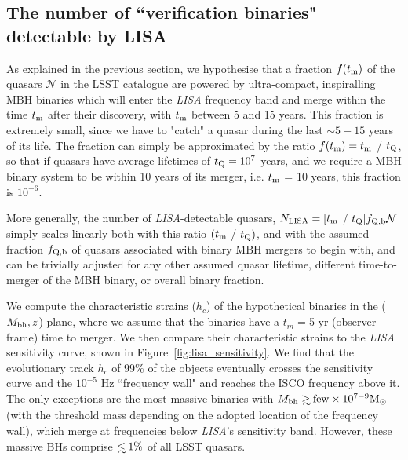 \documentclass[fleqn,usenatbib]{mnras}
\newcommand\lsim{\mathrel{\rlap{\lower4pt\hbox{\hskip1pt$\sim$}}
        \raise1pt\hbox{$<$}}}
\newcommand\gsim{\mathrel{\rlap{\lower4pt\hbox{\hskip1pt$\sim$}}
        \raise1pt\hbox{$>$}}}
\begin{document}
\subsection{The number of ``verification binaries" detectable by LISA} 
\label{sec:LISA-quasar-counts}
%
As explained in the previous section, we hypothesise that a fraction $f(t_{\rm m})$ of the quasars $\mathcal{N}$ in the LSST catalogue are powered by ultra-compact, inspiralling MBH binaries which will enter the {\it LISA} frequency band and merge within the time $t_{\rm m}$ after their discovery, with $t_{\rm m}$ between 5 and 15 years.
This fraction is extremely small, since we have to "catch" a quasar during the last $\sim 5-15$ years of its life. The fraction can simply be approximated by the ratio $f(t_{\rm m})=t_{\rm m}$ / $t_{\rm Q}$, so that if quasars have average lifetimes of $t_{\rm Q} = 10^7$ years, and we require a MBH binary system to be within 10 years of its merger, i.e. $t_{\rm m}$ = 10 years, this fraction is $10^{-6}$.

More generally, the number of {\it LISA}-detectable quasars, $N_{\rm LISA}=[t_{\rm m}$ / $t_{\rm Q}] f_{\rm Q,b} \mathcal{N}$ simply scales linearly both 
with this ratio $(t_{\rm m}$ / $t_{\rm Q})$, and with the assumed fraction $f_{\rm Q,b}$ of quasars associated with binary MBH mergers to begin with, and can be trivially adjusted for any other assumed quasar lifetime, different time-to-merger of the MBH binary, or overall binary fraction.

We compute the characteristic strains ($h_c$) of the hypothetical binaries in the ($M_{\rm bh},z$) plane, where we assume that the binaries have a $t_m=$5 yr (observer frame) time to merger. 
We then compare their characteristic strains to the {\it LISA} sensitivity curve, shown in Figure~\ref{fig:lisa_sensitivity}. 
We find that the evolutionary track $h_c$ of 99\% of the objects eventually crosses the sensitivity curve and the $10^{-5}$ Hz ``frequency wall" and reaches the ISCO frequency above it.
The only exceptions are the most massive binaries with  $M_{\rm bh}\gsim {\rm few}\times 10^{7-9} {\rm M_\odot}$ (with the threshold mass depending on the adopted location of the frequency wall), which merge at frequencies below {\it LISA}'s sensitivity band.  However, these massive BHs comprise $\lsim 1\%$ of all LSST quasars.
\end{document}
